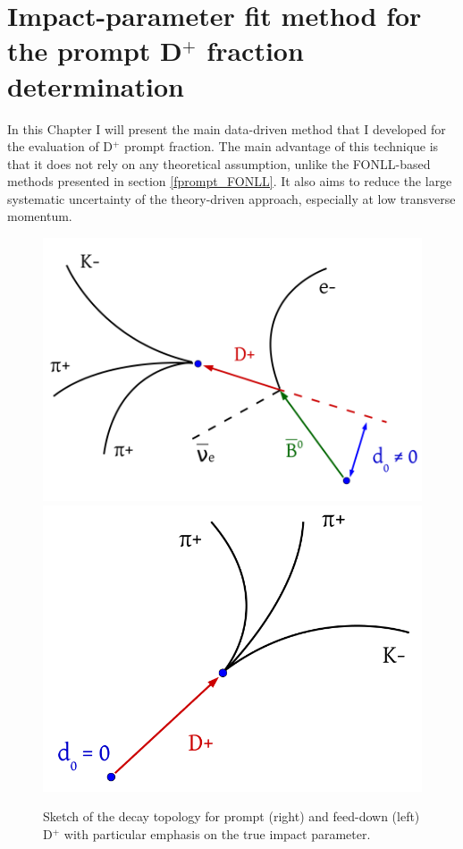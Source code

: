 \documentclass[b5paper,10pt,twoside,oldstyle,classica]{toptesi}
\begin{document}
\chapter{Impact-parameter fit method for the prompt D$^+$ fraction determination}
\label{IP_chapter}
In this Chapter I will present the main data-driven method that I developed for the evaluation of D$^+$ prompt fraction. The main advantage of this technique is that it does not rely on any theoretical assumption, unlike the FONLL-based methods presented in section \ref{fprompt_FONLL}. It also aims to reduce the large systematic uncertainty of the theory-driven approach, especially at low transverse momentum.
\begin{figure}[htb]
\begin{center}
{\includegraphics[scale = 0.25]{FD_sketch.png}}
\hspace{0cm}
{\includegraphics[scale = 0.25]{Prompt_sketch.png}}
\caption{Sketch of the decay topology for prompt (right) and feed-down (left) D$^+$ with particular emphasis on the true impact parameter.}
\label{IP_topology}
\end{center}
\end{figure}
\end{document}
